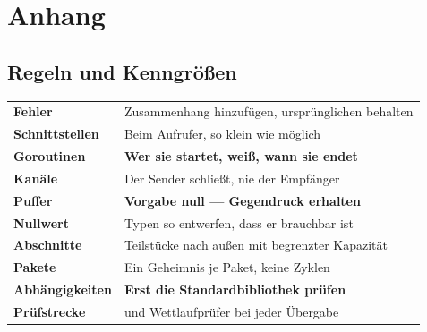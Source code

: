 \appendix
\part{Anhang}

\newcommand{\lit}[3]{\vspace{5pt}\noindent\textbf{[#1]} #2\par\nopagebreak\vspace{1pt}{\small\itshape\color{grau} #3}\par\vspace{2pt}}

\chapter{Regeln und Kenngrößen}

\begin{merksatz}
\begin{center}
{\small
\renewcommand{\arraystretch}{1.5}
\begin{tabular}{@{}P{3.2cm}P{5.4cm}@{}}
\toprule
\textbf{Fehler} & Zusammenhang hinzufügen, ursprünglichen behalten\\
\textbf{Schnittstellen} & Beim Aufrufer, so klein wie möglich\\
\textbf{Goroutinen} & \textbf{Wer sie startet, weiß, wann sie endet}\\
\textbf{Kanäle} & Der Sender schließt, nie der Empfänger\\
\textbf{Puffer} & \textbf{Vorgabe null --- Gegendruck erhalten}\\
\textbf{Nullwert} & Typen so entwerfen, dass er brauchbar ist\\
\textbf{Abschnitte} & Teilstücke nach außen mit begrenzter Kapazität\\
\textbf{Pakete} & Ein Geheimnis je Paket, keine Zyklen\\
\textbf{Abhängigkeiten} & \textbf{Erst die Standardbibliothek prüfen}\\
\textbf{Prüfstrecke} &  und Wettlaufprüfer bei jeder Übergabe\\
\bottomrule
\end{tabular}}
\end{center}
\end{merksatz}

